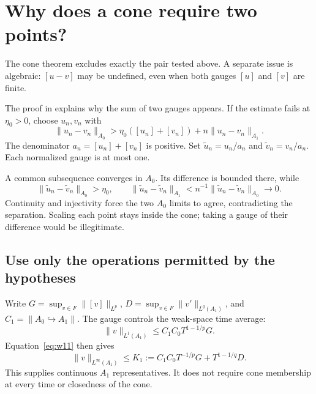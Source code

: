 \documentclass[12pt,reqno]{amsart}
\begin{document}
\section{Why does a cone require two points?}

\begin{theorem}\label{thm:cone}

\end{theorem}

The cone theorem \cite[Theorem 1 and Remark 2, pp.~3--4]{S-barrett-suli} excludes exactly the pair tested above. A separate issue is algebraic: $[u-v]$ may be undefined, even when both gauges $[u]$ and $[v]$ are finite.

\begin{lemma}\label{lem:ehrling}

\end{lemma}

The proof in \cite[Lemma 1, pp.~4--5]{S-barrett-suli} explains why the sum of two gauges appears. If the estimate fails at $\eta_0>0$, choose $u_n,v_n$ with
\[
\|u_n-v_n\|_{A_0}>
\eta_0([u_n]+[v_n])+n\|u_n-v_n\|_{A_1}.
\]
The denominator $a_n=[u_n]+[v_n]$ is positive. Set $\widetilde u_n=u_n/a_n$ and $\widetilde v_n=v_n/a_n$. Each normalized gauge is at most one.

A common subsequence converges in $A_0$. Its difference is bounded there, while
\[
\|\widetilde u_n-\widetilde v_n\|_{A_0}>\eta_0,
\qquad
\|\widetilde u_n-\widetilde v_n\|_{A_1}
<n^{-1}\|\widetilde u_n-\widetilde v_n\|_{A_0}\longrightarrow0.
\]
Continuity and injectivity force the two $A_0$ limits to agree, contradicting the separation. Scaling each point stays inside the cone; taking a gauge of their difference would be illegitimate.
\subsection{Use only the operations permitted by the hypotheses}

Write $G=\sup_{v\in F}\|[v]\|_{L^p}$, $D=\sup_{v\in F}\|v'\|_{L^q(A_1)}$, and $C_1=\|A_0\hookrightarrow A_1\|$. The gauge controls the weak-space time average:
\[
\|v\|_{L^1(A_1)}\le C_1C_0T^{1-1/p}G.
\]
Equation~\eqref{eq:w11} then gives
\begin{equation}\label{eq:coneamp}
\|v\|_{L^\infty(A_1)}\le K_1:=C_1C_0T^{-1/p}G+T^{1-1/q}D.
\end{equation}
This supplies continuous $A_1$ representatives. It does not require cone membership at every time or closedness of the cone.
\end{document}
